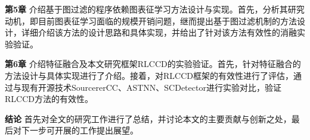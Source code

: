 \textbf{第5章}  \quad 介绍基于图过滤的程序依赖图表征学习方法设计与实现。首先，分析其研究动机，即目前图表征学习面临的规模开销问题，继而提出基于图过滤机制的方法设计，详细介绍该方法的设计思路和具体实现，并给出了针对该方法有效性的消融实验验证。

\textbf{第6章}  \quad 介绍特征融合及本文研究框架RLCCD的实验验证。首先，针对特征融合的方法设计与具体实现进行了介绍。接着，对RLCCD框架的有效性进行了评估，通过与现有开源技术SourcererCC\cite{7886988}、ASTNN\cite{8812062}、SCDetector\cite{10.1145/3324884.3416562}进行实验对比，验证RLCCD方法的有效性。

\textbf{结论}  \quad 首先对全文的研究工作进行了总结，并讨论本文的主要贡献与创新之处，最后对下一步可开展的工作提出展望。